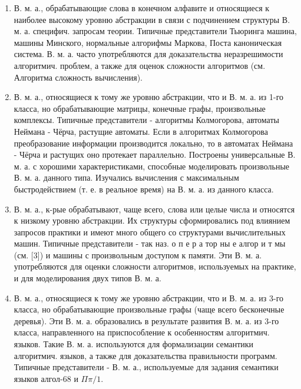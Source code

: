 \documentclass[10pt]{article}
\begin{document}
\begin{enumerate}

  \item В. м. а., обрабатывающие слова в конечном алфавите и относящиеся к наиболее высокому уровню абстракции в связи с подчинением структуры В. м. а. специфич. запросам теории. Типичные представители Тьюринга машина, машины Минского, нормальные алгорифмы Маркова, Поста каноническая система. В. м. а. часто употребляются для доказательства неразрешимости алгоритмич. проблем, а также для оценок сложности алгоритмов (см. Алгоритма сложность вычисления).



  \item В. м. а., относящиеся к тому же уровню абстракции, что и В. м. а. из 1-го класса, но обрабатывающие матрицы, конечные графы, произвольные комплексы. Типичные представители - алгоритмы Колмогорова, автоматы Неймана - Чёрча, растущие автоматы. Если в алгоритмах Колмогорова преобразование информации производится локально, то в автоматах Неймана - Чёрча и растущих оно протекает параллельно. Построены универсальные В. м. а. с хорошими характеристиками, способные моделировать произвольные В. м. а. данного типа. Изучались вычисления с максимальным быстродействием (т. е. в реальное время) на В. м. а. из данного класса.



  \item В. м. а., к-рые обрабатывают, чаще всего, слова или целые числа и относятся к низкому уровню абстракции. Их структуры сформировались под влиянием запросов практики и имеют много общего со структурами вычислительных машин. Типичные представители - так наз. о п е р а тор ны е алгор и т мы (см. [3]) и машины с произвольным доступом к памяти. Эти В. м. а. употребляются для оценки сложности алгоритмов, используемых на практике, и для моделирования двух типов В. м. а.



  \item В. м. а., относящиеся к тому же уровню абстракции, что и В. м. а. из 3-го класса, но обрабатывающие произвольные графы (чаще всего бесконечные деревья). Эти В. м. а. образовались в результате развития В. м. а. из 3-го класса, направленного на приспособление к особенностям алгоритмич. языков. Такие В. м. а. используются для формализации семантики алгоритмич. языков, а также для доказательства правильности программ. Типичные представители - В. м. а., используемые для задания семантики языков алгол-68 и $\Pi \pi / 1$.



\end{enumerate}
\end{document}
